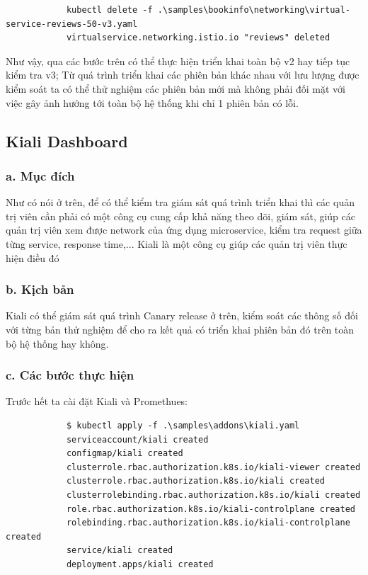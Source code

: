 \documentclass[12pt,a4paper]{report}
\begin{document}
{{\begin{lstlisting}
			kubectl delete -f .\samples\bookinfo\networking\virtual-service-reviews-50-v3.yaml
			virtualservice.networking.istio.io "reviews" deleted
		\end{lstlisting}
		Như vậy, qua các bước trên có thể thực hiện triển khai toàn bộ v2 hay tiếp tục kiểm tra v3; Từ quá trình triển khai các phiên bản khác nhau với lưu lượng được kiểm soát ta có thể thử nghiệm các phiên bản mới mà không phải đối mặt với việc gây ảnh hưởng tới toàn bộ hệ thống khi chỉ 1 phiên bản có lỗi.
		\subsection{Kiali Dashboard}
		\subsubsection{a. Mục đích}
		Như có nói ở trên, để có thể kiểm tra giám sát quá trình triển khai thì các quản trị viên cần phải có một công cụ cung cấp khả năng theo dõi, giám sát, giúp các quản trị viên xem được network của ứng dụng microservice, kiểm tra request giữa từng service, response time,... Kiali là một công cụ giúp các quản trị viên thực hiện điều đó
		\subsubsection{b. Kịch bản}
		Kiali có thể giám sát quá trình Canary release ở trên, kiểm soát các thông số đối với từng bản thử nghiệm để cho ra kết quả có triển khai phiên bản đó trên toàn bộ hệ thống hay không.
		\subsubsection{c. Các bước thực hiện}
		Trước hết ta cài đặt Kiali và Promethues:
		\begin{lstlisting}
			$ kubectl apply -f .\samples\addons\kiali.yaml
			serviceaccount/kiali created
			configmap/kiali created
			clusterrole.rbac.authorization.k8s.io/kiali-viewer created
			clusterrole.rbac.authorization.k8s.io/kiali created
			clusterrolebinding.rbac.authorization.k8s.io/kiali created
			role.rbac.authorization.k8s.io/kiali-controlplane created
			rolebinding.rbac.authorization.k8s.io/kiali-controlplane created
			service/kiali created
			deployment.apps/kiali created
			

\end{lstlisting}}}
\end{document}
